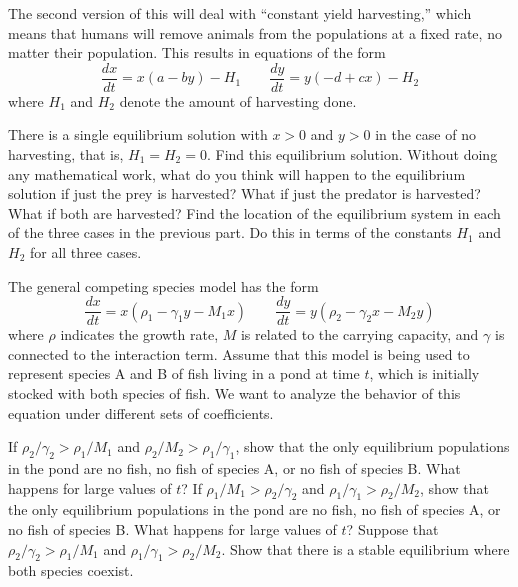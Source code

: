 \begin{exercise}
The second version of this will deal with ``constant yield harvesting,'' which means that humans will remove animals from the populations at a fixed rate, no matter their population. This results in equations of the form
\[ \frac{dx}{dt} = x(a - by) - H_1 \qquad \frac{dy}{dt} = y(-d + cx) - H_2 \] where $H_1$ and $H_2$ denote the amount of harvesting done.
\begin{tasks}
\task There is a single equilibrium solution with $x > 0$ and $y>0$ in the case of no harvesting, that is, $H_1 = H_2 = 0$. Find this equilibrium solution.
\task Without doing any mathematical work, what do you think will happen to the equilibrium solution if just the prey is harvested? What if just the predator is harvested? What if both are harvested?
\task Find the location of the equilibrium system in each of the three cases in the previous part. Do this in terms of the constants $H_1$ and $H_2$ for all three cases. 
\end{tasks}
\end{exercise}

\begin{exercise}
The general competing species model has the form
\[ \frac{dx}{dt} = x(\rho_1 - \gamma_1 y - M_1 x) \qquad \frac{dy}{dt} = y(\rho_2 - \gamma_2 x - M_2 y) \] where $\rho$ indicates the growth rate, $M$ is related to the carrying capacity, and $\gamma$ is connected to the interaction term. Assume that this model is being used to represent species A and B of fish living in a pond at time $t$, which is initially stocked with both species of fish. We want to analyze the behavior of this equation under different sets of coefficients.
\begin{tasks}
\task If $\rho_2/\gamma_2 > \rho_1/M_1$ and $\rho_2/M_2 > \rho_1/\gamma_1$, show that the only equilibrium populations in the pond are no fish, no fish of species A, or no fish of species B. What happens for large values of $t$?
\task If $ \rho_1/M_1 > \rho_2/\gamma_2 $ and $\rho_1/\gamma_1 > \rho_2/M_2$, show that the only equilibrium populations in the pond are no fish, no fish of species A, or no fish of species B. What happens for large values of $t$?
\task Suppose that $\rho_2/\gamma_2 > \rho_1/M_1$ and $\rho_1/\gamma_1 > \rho_2/M_2$. Show that there is a stable equilibrium where both species coexist. 
\end{tasks}
\end{exercise}

